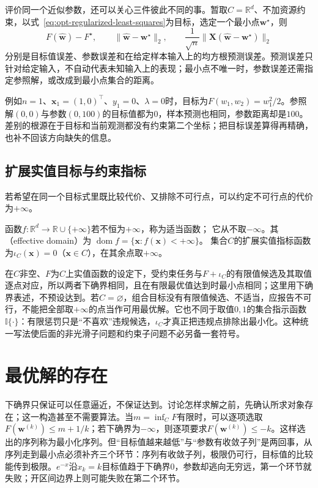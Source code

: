 评价同一个近似参数，还可以关心三件彼此不同的事。暂取$C=\mathbb R^d$、不加资源约束，以式~\eqref{eq:opt-regularized-least-squares}为目标，选定一个最小点$\bm w^\star$，则
\[
  F(\widehat{\bm{w}})-F^\star,\qquad
  \lVert\widehat{\bm{w}}-\bm{w}^\star\rVert_2,\qquad
  \frac{1}{\sqrt n}\lVert\bm X(\widehat{\bm{w}}-\bm{w}^\star)\rVert_2
\]
分别是目标值误差、参数误差和在给定样本输入上的均方根预测误差。预测误差只针对给定输入，不自动代表未知输入上的表现；最小点不唯一时，参数误差还需指定参照解，或改成到最小点集合的距离。

例如$n=1$、$\bm x_1=(1,0)^\top$、$y_1=0$、$\lambda=0$时，目标为$F(w_1,w_2)=w_1^2/2$。参照解$(0,0)$与参数$(0,100)$的目标值都为$0$，样本预测也相同，参数距离却是$100$。差别的根源在于目标和当前观测都没有约束第二个坐标；把目标误差算得再精确，也补不回该方向缺失的信息。

\subsection{扩展实值目标与约束指标}

若希望在同一个目标式里既比较代价、又排除不可行点，可以约定不可行点的代价为$+\infty$。

\begin{definition}
\label{def:opt-proper-domain-indicator}
函数$f:\mathbb R^d\to\mathbb R\cup\{+\infty\}$若不恒为$+\infty$，称为适当函数；
它从不取$-\infty$。其（effective domain）为
$\operatorname{dom}f=\{\bm x:f(\bm x)<+\infty\}$。
集合$C$的扩展实值指标函数为$\iota_C(\bm x)=0$（$\bm x\in C$），在其余点取$+\infty$。
\end{definition}

在$C$非空、$F$为$C$上实值函数的设定下，受约束任务与$F+\iota_C$的有限值候选及其取值逐点对应，所以两者下确界相同，且在有限最优值达到时最小点相同；这里用下确界表述，不预设达到。若$C=\varnothing$，组合目标没有有限值候选、不适当，应报告不可行，不能把全部取$+\infty$的点当作可用最优解。它也不同于取值$0,1$的集合指示函数$\mathbb I\{\cdot\}$：有限惩罚只是“不喜欢”违规候选，$\iota_C$才真正把违规点排除出最小化。这种统一写法使后面的非光滑子问题和约束子问题不必另备一套符号。

\section{最优解的存在}
\label{sec:opt-existence}

下确界只保证可以任意逼近，不保证达到。讨论怎样求解之前，先确认所求对象存在；这一构造甚至不需要算法。当$m=\inf_C F$有限时，可以逐项选取$F(\bm w^{(k)})\leq m+1/k$；若下确界为$-\infty$，则逐项要求$F(\bm w^{(k)})\leq-k$。这样选出的序列称为最小化序列。但“目标值越来越低”与“参数有收敛子列”是两回事，从序列走到最小点必须补齐三个环节：序列有收敛子列，极限仍可行，目标值的比较能传到极限。$e^{-x}$沿$x_k=k$目标值趋于下确界$0$，参数却逃向无穷远，第一个环节就失败；开区间边界上则可能失败在第二个环节。

